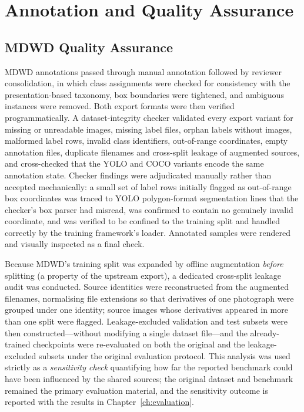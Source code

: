 \section{Annotation and Quality Assurance}
\label{sec:annotation-quality-assurance}

\subsection{MDWD Quality Assurance}

MDWD annotations passed through manual annotation followed by reviewer consolidation, in which class assignments were checked for consistency with the presentation-based taxonomy, box boundaries were tightened, and ambiguous instances were removed. Both export formats were then verified programmatically. A dataset-integrity checker validated every export variant for missing or unreadable images, missing label files, orphan labels without images, malformed label rows, invalid class identifiers, out-of-range coordinates, empty annotation files, duplicate filenames and cross-split leakage of augmented sources, and cross-checked that the YOLO and COCO variants encode the same annotation state. Checker findings were adjudicated manually rather than accepted mechanically: a small set of label rows initially flagged as out-of-range box coordinates was traced to YOLO polygon-format segmentation lines that the checker's box parser had misread, was confirmed to contain no genuinely invalid coordinate, and was verified to be confined to the training split and handled correctly by the training framework's loader. Annotated samples were rendered and visually inspected as a final check.

Because MDWD's training split was expanded by offline augmentation \emph{before} splitting (a property of the upstream export), a dedicated cross-split leakage audit was conducted. Source identities were reconstructed from the augmented filenames, normalising file extensions so that derivatives of one photograph were grouped under one identity; source images whose derivatives appeared in more than one split were flagged. Leakage-excluded validation and test subsets were then constructed---without modifying a single dataset file---and the already-trained checkpoints were re-evaluated on both the original and the leakage-excluded subsets under the original evaluation protocol. This analysis was used strictly as a \emph{sensitivity check} quantifying how far the reported benchmark could have been influenced by the shared sources; the original dataset and benchmark remained the primary evaluation material, and the sensitivity outcome is reported with the results in Chapter~\ref{ch:evaluation}.

